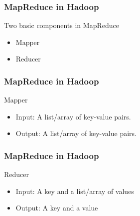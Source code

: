 \documentclass{beamer}
\begin{document}

\begin{frame}[fragile]
\frametitle{MapReduce in Hadoop}

Two basic components in MapReduce
\begin{itemize}
\item Mapper
\item Reducer
\end{itemize}

\end{frame}






\begin{frame}[fragile]
\frametitle{MapReduce in Hadoop}

Mapper
\begin{itemize}
 \item Input: A list/array of key-value pairs. 
 \item Output: A list/array of key-value pairs.
\end{itemize}

\end{frame}




\begin{frame}[fragile]
\frametitle{MapReduce in Hadoop}

Reducer
\begin{itemize}
 \item Input: A key and a list/array of values
 \item Output: A key and a value
\end{itemize}

\end{frame}



\end{document}

